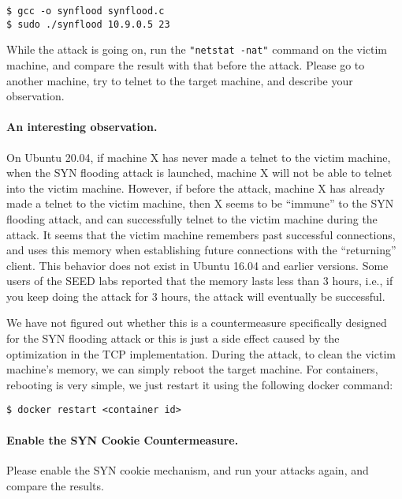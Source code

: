 \begin{lstlisting}
$ gcc -o synflood synflood.c
$ sudo ./synflood 10.9.0.5 23
\end{lstlisting}
 

While the attack is going on, 
run the \texttt{"netstat -nat"} command on the victim machine, and compare 
the result with that before the attack. 
Please go to another machine, try to telnet to the target machine, 
and describe your observation.


\paragraph{An interesting observation.} On Ubuntu 20.04, if machine X
has never made a telnet to the victim machine, when the SYN flooding 
attack is launched, machine X will not be able to telnet into the 
victim machine. However, if before the attack, machine X
has already made a telnet to the victim machine, then X 
seems to be ``immune'' to the SYN flooding attack, and can
successfully telnet to the victim machine during the attack. 
It seems that the victim machine remembers past successful 
connections, and uses this memory when establishing
future connections with the ``returning'' client. 
This behavior does not exist in Ubuntu 16.04 
and earlier versions. Some users of the SEED labs
reported that the memory lasts less than 3 hours, i.e.,
if you keep doing the attack for 3 hours, the attack
will eventually be successful.


We have not figured out whether this is a countermeasure specifically designed
for the SYN flooding attack or this is just a side effect caused by
the optimization in the TCP implementation. During the attack, 
to clean the victim machine's memory, 
we can simply reboot the target machine.
For containers, rebooting is very simple, we 
just restart it using the following docker command:

\begin{lstlisting}
$ docker restart <container id>
\end{lstlisting}
 



\paragraph{Enable the SYN Cookie Countermeasure.}
Please enable the SYN cookie mechanism, and 
run your attacks again, and compare the results. 



